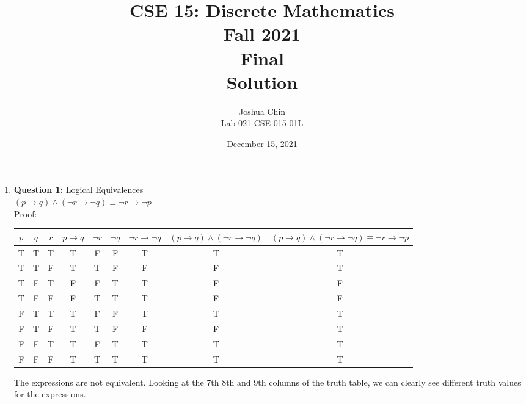 \documentclass[11pt]{article}
\begin{document}
\author{Joshua Chin\\
Lab 021-CSE 015 01L}

\title{CSE 15: Discrete Mathematics\\
Fall 2021\\
Final \\
Solution}

\date{December 15, 2021}
\maketitle

\begin{enumerate}

\item
\textbf{Question 1:} Logical Equivalences \\
$(p \rightarrow q) \wedge (\lnot r \rightarrow \lnot q) \equiv \lnot r \rightarrow \lnot p$ \\
Proof: \\
\begin{tabular}{|c|c|c|c|c|c|c|c|c|} \hline
$p$ & $q$ & $r$ & $p \rightarrow q$ & $\lnot r$ & $\lnot q$ & $\lnot r \rightarrow \lnot q$ & $(p \rightarrow q) \wedge (\lnot r \rightarrow \lnot q)$ & $(p \rightarrow q) \wedge (\lnot r \rightarrow \lnot q) \equiv \lnot r \rightarrow \lnot p$ \\
\hline
T&T&T&T&F&F&T&T&T \\
\hline
T&T&F&T&T&F&F&F&T \\
\hline
T&F&T&F&F&T&T&F&F \\
\hline
T&F&F&F&T&T&T&F&F \\
\hline
F&T&T&T&F&F&T&T&T \\
\hline
F&T&F&T&T&F&F&F&T \\
\hline
F&F&T&T&F&T&T&T&T \\
\hline
F&F&F&T&T&T&T&T&T \\
\hline
\end{tabular}
The expressions are not equivalent. Looking at the 7th 8th and 9th columns of the truth table, we can clearly see different truth values for the expressions.


\end{enumerate}
\end{document}
